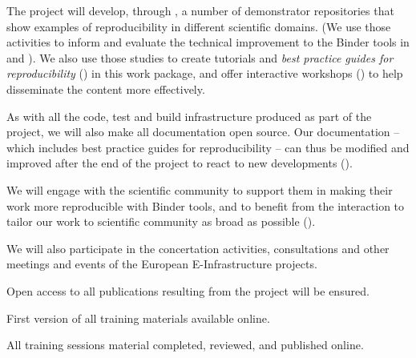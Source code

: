 \begin{workpackage}[id=education,wphases=0-36,swsites,
  title=Education and Dissemination,
  short=Education,
  lead=IFR,
  IFRRM=10,
  MPRM=6,
  SRLRM=7,
  QSRM=3,
  UIORM=9
]
\begin{wpdescription}
  The \TheProject project will develop, through , a number
  of demonstrator repositories that show examples of reproducibility in
  different scientific domains. (We use
  those activities to inform and evaluate the technical improvement to the
  Binder tools in  and ). We also use those
  studies to create tutorials and \emph{best practice guides for
    reproducibility} () in this work package, and
  offer interactive workshops () to help disseminate the
  content more effectively.

  As with all the code, test and build infrastructure produced as part of the
  project, we will also make all documentation open source. Our documentation --
  which includes best practice guides for reproducibility -- can thus be
  modified and improved after the end of the project to react to new
  developments ().

  We will engage with the scientific community to support them in making their
  work more reproducible with Binder tools, and to benefit from the interaction
  to tailor our work to scientific community as broad as possible
  ().

  We will also participate in the concertation activities, consultations and
  other meetings and events of the European E-Infrastructure projects. 

  Open access to all publications resulting from the project will be ensured.
\end{wpdescription}

\begin{tasklist}




\end{tasklist}


\begin{wpdelivs}
\begin{wpdeliv}[due=24,id=education-materials1,dissem=PU,miles=prototype,nature=R,lead=UIO]
  {First version of all training materials available online. }
\end{wpdeliv}
\begin{wpdeliv}[due=36,id=education-materials2,dissem=PU,miles=final,nature=R,lead=UIO]
  {All training sessions material completed, reviewed, and published online.}
\end{wpdeliv}
\end{wpdelivs}

\end{workpackage}
